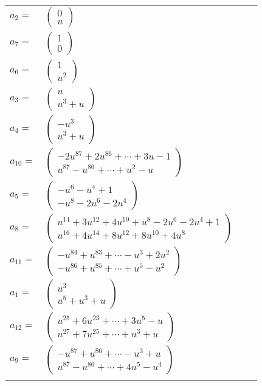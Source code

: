 \documentclass[1p]{elsarticle_modified}
\theoremstyle{definition}
\begin{document}
\begin{tabular}{m{7pt} m{180pt} m{7pt} m{180pt} }
\flushright $a_{2}=$&$\begin{pmatrix}0\\u\end{pmatrix}$ \\
\flushright $a_{7}=$&$\begin{pmatrix}1\\0\end{pmatrix}$ \\
\flushright $a_{6}=$&$\begin{pmatrix}1\\u^2\end{pmatrix}$ \\
\flushright $a_{3}=$&$\begin{pmatrix}u\\u^3+u\end{pmatrix}$ \\
\flushright $a_{4}=$&$\begin{pmatrix}- u^3\\u^3+u\end{pmatrix}$ \\
\flushright $a_{10}=$&$\begin{pmatrix}-2 u^{87}+2 u^{86}+\cdots+3 u-1\\u^{87}- u^{86}+\cdots+u^2- u\end{pmatrix}$ \\
\flushright $a_{5}=$&$\begin{pmatrix}- u^6- u^4+1\\- u^8-2 u^6-2 u^4\end{pmatrix}$ \\
\flushright $a_{8}=$&$\begin{pmatrix}u^{14}+3 u^{12}+4 u^{10}+u^8-2 u^6-2 u^4+1\\u^{16}+4 u^{14}+8 u^{12}+8 u^{10}+4 u^8\end{pmatrix}$ \\
\flushright $a_{11}=$&$\begin{pmatrix}- u^{84}+u^{83}+\cdots- u^3+2 u^2\\- u^{86}+u^{85}+\cdots+u^5- u^2\end{pmatrix}$ \\
\flushright $a_{1}=$&$\begin{pmatrix}u^3\\u^5+u^3+u\end{pmatrix}$ \\
\flushright $a_{12}=$&$\begin{pmatrix}u^{25}+6 u^{23}+\cdots+3 u^5- u\\u^{27}+7 u^{25}+\cdots+u^3+u\end{pmatrix}$ \\
\flushright $a_{9}=$&$\begin{pmatrix}- u^{87}+u^{86}+\cdots- u^3+u\\u^{87}- u^{86}+\cdots+4 u^5- u^4\end{pmatrix}$\\&\end{tabular}
\end{document}
